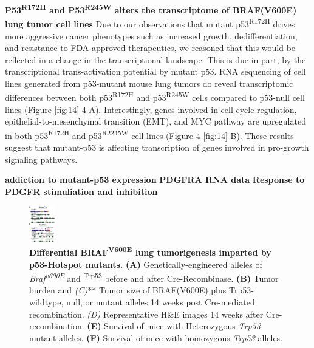 \textbf{P53\textsuperscript{R172H} and P53\textsuperscript{R245W} alters the transcriptome of BRAF(V600E) lung tumor cell lines}
Due to our observations that mutant p53\textsuperscript{R172H} drives more aggressive cancer phenotypes such as increased growth, dedifferentiation, and resistance to FDA-approved therapeutics, we reasoned that this would be reflected in a change in the transcriptional landscape. This is due in part, by the transcriptional trans-activation potential by mutant p53. RNA sequencing of cell lines generated from p53-mutant mouse lung tumors do reveal transcriptomic differences between both p53\textsuperscript{R172H} and p53\textsuperscript{R245W} cells compared to p53-null cell lines (Figure \ref{fig:14} 4 A). Interestingly, genes involved in cell cycle regulation, epithelial-to-mesenchymal transition (EMT), and MYC pathway are upregulated in both p53\textsuperscript{R172H} and p53\textsuperscript{R2245W} cell lines (Figure 4 \ref{fig:14} B). These results suggest that mutant-p53 is affecting transcription of genes involved in pro-growth signaling pathways.

\textbf{addiction to mutant-p53 expression}
\textbf{PDGFRA RNA data}
\textbf{Response to PDGFR stimuliation and inhibition}

\begin{figure}
\hypertarget{fig:11}{%
\centering
\includegraphics[width=0.1\textwidth,height=\textheight]{images/p53_1.png}
\caption{\textbf{Differential BRAF\textsuperscript{V600E} lung tumorigenesis imparted by p53-Hotspot mutants.} \textbf{(A)} Genetically-engineered alleles of \emph{Braf\textsuperscript{v600E}} and \textsuperscript{Trp53} before and after Cre-Recombinase. \textbf{(B)} Tumor burden and \emph{(C)}** Tumor size of BRAF(V600E) plus Trp53-wildtype, null, or mutant alleles 14 weeks post Cre-mediated recombination. \emph{(D)} Representative H\&E images 14 weeks after Cre-recombination. \textbf{(E)} Survival of mice with Heterozygous \emph{Trp53} mutant alleles. \textbf{(F)} Survival of mice with homozygous \emph{Trp53} alleles.}\label{fig:11}
}
\end{figure}

